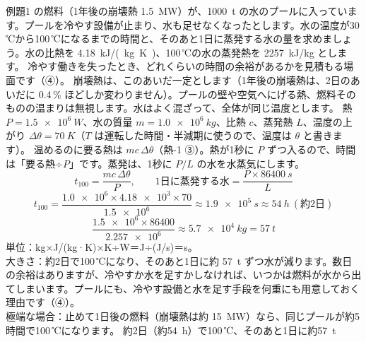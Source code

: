 \begin{phreidai}[冷やせなくなったプール]\label{ph:原-16:ex3}
例題1 の燃料（1年後の崩壊熱 \qty{1.5}{MW}）が、\qty{1000}{t} の水のプールに入っています。プールを冷やす設備が止まり、水も足せなくなったとします。水の温度が30\,℃から100\,℃になるまでの時間と、そのあと1日に蒸発する水の量を求めましょう。水の比熱を \qty{4.18}{kJ/(kg.K)}、100\,℃の水の蒸発熱を \qty{2257}{kJ/kg} とします。
\phbamen
冷やす働きを失ったとき、どれくらいの時間の余裕があるかを見積もる場面です（④）。
\phmushi
崩壊熱は、このあいだ一定とします（1年後の崩壊熱は、2日のあいだに 0.4\,\% ほどしか変わりません）。プールの壁や空気へにげる熱、燃料そのものの温まりは無視します。水はよく混ざって、全体が同じ温度とします。
\phzu
熱 $P=\qty{1.5e6}{W}$、水の質量 $m=\qty{1.0e6}{kg}$、比熱 $c$、蒸発熱 $L$、温度の上がり $\Delta\theta=\qty{70}{K}$（$T$ は運転した時間・半減期に使うので、温度は $\theta$ と書きます）。
\phriyu
温めるのに要る熱は $mc\,\Delta\theta$（熱-1 ③）。熱が1秒に $P$ ずつ入るので、時間は「要る熱÷$P$」です。蒸発は、1秒に $P/L$ の水を水蒸気にします。
\phtateru
\[ t_{100}=\frac{mc\,\Delta\theta}{P},\qquad \text{1日に蒸発する水}=\frac{P\times\qty{86400}{s}}{L} \]
\phtoku
\[ t_{100}=\frac{\num{1.0e6}\times\num{4.18e3}\times70}{\num{1.5e6}}\approx\qty{1.9e5}{s}\approx\qty{54}{h}\ (\text{約2日}) \]
\[ \frac{\num{1.5e6}\times86400}{\num{2.257e6}}\approx\qty{5.7e4}{kg}=\qty{57}{t} \]
\phtashikame
単位：kg×J/(kg·K)×K÷W＝J÷(J/s)＝s。\\
大きさ：約2日で100\,℃になり、そのあと1日に約 \qty{57}{t} ずつ水が減ります。数日の余裕はありますが、冷やすか水を足すかしなければ、いつかは燃料が水から出てしまいます。プールにも、冷やす設備と水を足す手段を何重にも用意しておく理由です（④）。\\
極端な場合：止めて1日後の燃料（崩壊熱は約 \qty{15}{MW}）なら、同じプールが約5時間で100\,℃になります。
\kotae 約2日（約\qty{54}{h}）で100\,℃、そのあと1日に約\qty{57}{t}
\end{phreidai}

